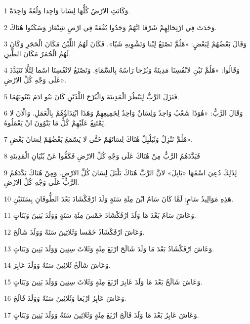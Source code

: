 \par 1 وَكَانَتِ الارْضُ كُلُّهَا لِسَانا وَاحِدا وَلُغَةً وَاحِدَةً.
\par 2 وَحَدَثَ فِي ارْتِحَالِهِمْ شَرْقا انَّهُمْ وَجَدُوا بُقْعَةً فِي ارْضِ شِنْعَارَ وَسَكَنُوا هُنَاكَ.
\par 3 وَقَالَ بَعْضُهُمْ لِبَعْضٍ: «هَلُمَّ نَصْنَعُ لِبْنا وَنَشْوِيهِ شَيّا». فَكَانَ لَهُمُ اللِّبْنُ مَكَانَ الْحَجَرِ وَكَانَ لَهُمُ الْحُمَرُ مَكَانَ الطِّينِ.
\par 4 وَقَالُوا: «هَلُمَّ نَبْنِ لانْفُسِنَا مَدِينَةً وَبُرْجا رَاسُهُ بِالسَّمَاءِ. وَنَصْنَعُ لانْفُسِنَا اسْما لِئَلَّا نَتَبَدَّدَ عَلَى وَجْهِ كُلِّ الارْضِ».
\par 5 فَنَزَلَ الرَّبُّ لِيَنْظُرَ الْمَدِينَةَ وَالْبُرْجَ اللَّذَيْنِ كَانَ بَنُو ادَمَ يَبْنُونَهُمَا.
\par 6 وَقَالَ الرَّبُّ: «هُوَذَا شَعْبٌ وَاحِدٌ وَلِسَانٌ وَاحِدٌ لِجَمِيعِهِمْ وَهَذَا ابْتِدَاؤُهُمْ بِالْعَمَلِ. وَالْانَ لا يَمْتَنِعُ عَلَيْهِمْ كُلُّ مَا يَنْوُونَ انْ يَعْمَلُوهُ.
\par 7 هَلُمَّ نَنْزِلْ وَنُبَلْبِلْ هُنَاكَ لِسَانَهُمْ حَتَّى لا يَسْمَعَ بَعْضُهُمْ لِسَانَ بَعْضٍ».
\par 8 فَبَدَّدَهُمُ الرَّبُّ مِنْ هُنَاكَ عَلَى وَجْهِ كُلِّ الارْضِ فَكَفُّوا عَنْ بُنْيَانِ الْمَدِينَةِ
\par 9 لِذَلِكَ دُعِيَ اسْمُهَا «بَابِلَ» لانَّ الرَّبَّ هُنَاكَ بَلْبَلَ لِسَانَ كُلِّ الارْضِ. وَمِنْ هُنَاكَ بَدَّدَهُمُ الرَّبُّ عَلَى وَجْهِ كُلِّ الارْضِ.
\par 10 هَذِهِ مَوَالِيدُ سَامٍ: لَمَّا كَانَ سَامٌ ابْنَ مِئَةِ سَنَةٍ وَلَدَ ارْفَكْشَادَ بَعْدَ الطُّوفَانِ بِسَنَتَيْنِ.
\par 11 وَعَاشَ سَامٌ بَعْدَ مَا وَلَدَ ارْفَكْشَادَ خَمْسَ مِئَةِ سَنَةٍ وَوَلَدَ بَنِينَ وَبَنَاتٍ.
\par 12 وَعَاشَ ارْفَكْشَادُ خَمْسا وَثَلاثِينَ سَنَةً وَوَلَدَ شَالَحَ.
\par 13 وَعَاشَ ارْفَكْشَادُ بَعْدَ مَا وَلَدَ شَالَحَ ارْبَعَ مِئَةٍ وَثَلاثَ سِنِينَ وَوَلَدَ بَنِينَ وَبَنَاتٍ.
\par 14 وَعَاشَ شَالَحُ ثَلاثِينَ سَنَةً وَوَلَدَ عَابِرَ.
\par 15 وَعَاشَ شَالَحُ بَعْدَ مَا وَلَدَ عَابِرَ ارْبَعَ مِئَةٍ وَثَلاثَ سِنِينَ وَوَلَدَ بَنِينَ وَبَنَاتٍ.
\par 16 وَعَاشَ عَابِرُ ارْبَعا وَثَلاثِينَ سَنَةً وَوَلَدَ فَالَجَ.
\par 17 وَعَاشَ عَابِرُ بَعْدَ مَا وَلَدَ فَالَجَ ارْبَعَ مِئَةٍ وَثَلاثِينَ سَنَةً وَوَلَدَ بَنِينَ وَبَنَاتٍ.
